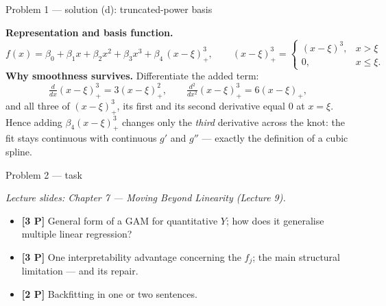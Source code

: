 \documentclass[aspectratio=169,11pt]{beamer}
\begin{document}
\begin{frame}{Problem 1 --- solution (d): truncated-power basis}
  \begin{solutionbox}
    \textbf{Representation and basis function.}
    \[
      f(x)=\beta_0+\beta_1x+\beta_2x^2+\beta_3x^3+\beta_4\,(x-\xi)^3_+,
      \qquad
      (x-\xi)^3_+=\begin{cases}(x-\xi)^3,& x>\xi\\[0.5mm] 0,& x\le\xi.\end{cases}
    \]
    \textbf{Why smoothness survives.} Differentiate the added term:
    \[
      \tfrac{d}{dx}(x-\xi)^3_+=3(x-\xi)^2_+,\qquad
      \tfrac{d^2}{dx^2}(x-\xi)^3_+=6(x-\xi)_+,
    \]
    and all three of $(x-\xi)^3_+$, its first and its second derivative equal $0$ at $x=\xi$.
    Hence adding $\beta_4(x-\xi)^3_+$ changes only the \emph{third} derivative across the knot: the
    fit stays continuous with continuous $g'$ and $g''$ --- exactly the definition of a cubic spline.
  \end{solutionbox}
\end{frame}

\begin{frame}{Problem 2 --- task}
  \begin{exercise}
    {\scriptsize\itshape Lecture slides: Chapter 7 --- Moving Beyond Linearity (Lecture 9).}\par\smallskip
    \begin{itemize}
      \item[(a)] \textbf{[3 P]} General form of a GAM for quantitative $Y$; how does it generalise
        multiple linear regression?
      \item[(b)] \textbf{[3 P]} One interpretability advantage concerning the $f_j$;
        the main structural limitation --- and its repair.
      \item[(c)] \textbf{[2 P]} Backfitting in one or two sentences.
    \end{itemize}
  \end{exercise}
\end{frame}
\end{document}
